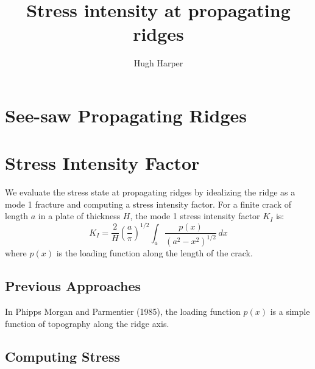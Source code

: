 \documentclass{article}
\author{Hugh Harper}
\title{Stress intensity at propagating ridges}
\begin{document}
\maketitle
\section{See-saw Propagating Ridges}

\section{Stress Intensity Factor}
We evaluate the stress state at propagating ridges by idealizing the ridge as a mode 1 fracture and computing a stress intensity factor. For a finite crack of length $a$ in a plate of thickness $H$, the mode 1 stress intensity factor $K_I$ is:
\begin{equation}
	K_I = \frac{2}{H}\left(\frac{a}{\pi}\right)^{1/2}\int_a \frac{p\left(x\right)}{\left(a^2 - x^2 \right)^{1/2}}\, dx
\end{equation}
where $p(x)$ is the loading function along the length of the crack.

\subsection{Previous Approaches}
In Phipps Morgan and Parmentier (1985), the loading function $p(x)$ is a simple function of topography along the ridge axis.

\subsection{Computing Stress}
\end{document}
